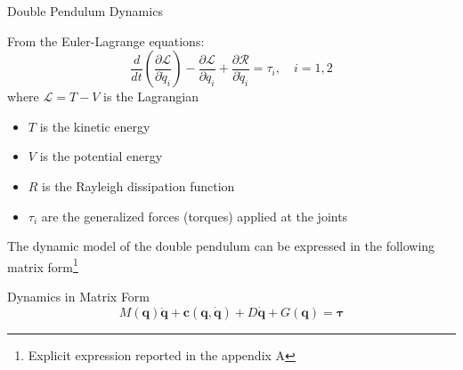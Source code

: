 \begin{frame}{Double Pendulum Dynamics}

    From the Euler-Lagrange equations:
    \begin{equation}
        \frac{d}{dt} \left( \frac{\partial \mathcal{L}}{\partial \dot{q}_i} \right) - \frac{\partial \mathcal{L}}{\partial q_i} + \frac{\partial \mathcal{R}}{\partial \dot{q}_i}= \tau_i, \quad i = 1, 2
    \end{equation}
    where $\mathcal{L} = T - V$ is the Lagrangian 
    \begin{itemize}
        \item $T$ is the kinetic energy
        \item $V$ is the potential energy
        \item $R$ is the Rayleigh dissipation function
        \item $\tau_i$ are the generalized forces (torques) applied at the joints
    \end{itemize}

    \vspace{10px}
    The dynamic model of the double pendulum can be expressed in the following matrix form\footnote{Explicit expression reported in the appendix A}

    \begin{block}{Dynamics in Matrix Form}
        \begin{equation}
            M(\mathbf{q})\ddot{\mathbf{q}} + \mathbf{c}(\mathbf{q}, \dot{\mathbf{q}}) + D\dot{\mathbf{q}} + G(\mathbf{q}) = \mathbf{\tau}
        \end{equation}
    \end{block}

\end{frame}


